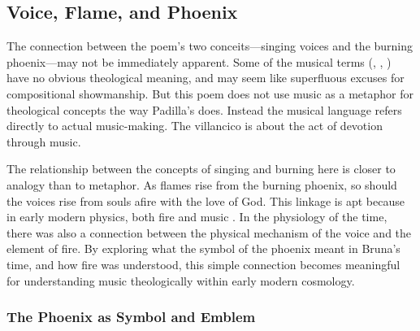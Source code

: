 \subsection{Voice, Flame, and Phoenix}

The connection between the poem's two conceits---singing voices and the burning phoenix---may not be immediately apparent.
Some of the musical terms (, , ) have no obvious theological meaning, and may seem like superfluous excuses for compositional showmanship.
But this poem does not use music as a metaphor for theological concepts the way Padilla's  does.
Instead the musical language refers directly to actual music-making.
The villancico is about the act of devotion through music.

The relationship between the concepts of singing and burning here is closer to analogy than to metaphor.
As flames rise from the burning phoenix, so should the voices rise from souls afire with the love of God.
This linkage is apt because in early modern physics, both fire and music .
In the physiology of the time, there was also a connection between the physical mechanism of the voice and the element of fire.
By exploring what the symbol of the phoenix meant in Bruna's time, and how fire was understood, this simple connection becomes meaningful for understanding music theologically within early modern cosmology.

\subsubsection{The Phoenix as Symbol and Emblem}

